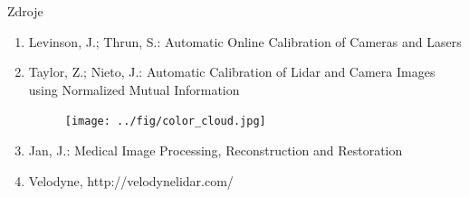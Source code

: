 \documentclass[pdf]{beamer}
\begin{document}
	\begin{frame}{Zdroje}
		\begin{enumerate}
  			\item Levinson, J.; Thrun, S.: Automatic Online Calibration of Cameras and Lasers
  			\item Taylor, Z.; Nieto, J.: Automatic Calibration of Lidar and Camera Images using Normalized Mutual Information
  			\begin{figure}[h]
				\texttt{[image: ../fig/color\_cloud.jpg]}
			\end{figure}
  			\item Jan, J.: Medical Image Processing, Reconstruction and Restoration
  			\item Velodyne, http://velodynelidar.com/
  		\end{enumerate}
	\end{frame}
	
\end{document}
